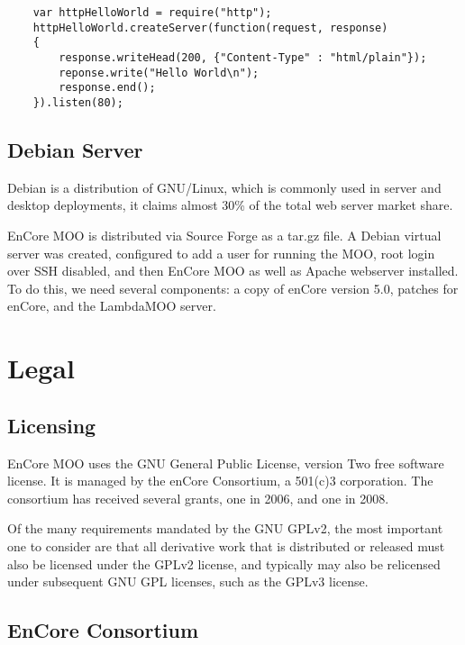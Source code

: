 \documentclass[12pt, letterpaper]{report}
\begin{document}
    \begin{lstlisting}
    var httpHelloWorld = require("http");
    httpHelloWorld.createServer(function(request, response)
    {
        response.writeHead(200, {"Content-Type" : "html/plain"});
        reponse.write("Hello World\n");
        response.end();
    }).listen(80);
    \end{lstlisting}
    
    
	\section{Debian Server}
	\par
	Debian is a distribution of GNU/Linux, which is commonly used in server and desktop deployments, it claims almost 30\% of the total web server market share.
	
	\par 
	EnCore MOO is distributed via Source Forge as a tar.gz file. A Debian virtual server was created, configured to add a user for running the MOO, root login over SSH disabled, and then EnCore MOO as well as Apache webserver installed. To do this, we need several components: a copy of enCore version 5.0, patches for enCore, and the LambdaMOO server.
    	
	\chapter{Legal}
	\section{Licensing}
	\par
	EnCore MOO uses the GNU General Public License, version Two free software license. It is managed by the enCore Consortium, a 501(c)3 corporation. The consortium has received several grants, one in 2006, and one in 2008.
	
	\par
	Of the many requirements mandated by the GNU GPLv2, the most important one to consider are that all derivative work that is distributed or released must also be licensed under the GPLv2 license, and typically may also be relicensed under subsequent GNU GPL licenses, such as the GPLv3 license.
	
	\section{EnCore Consortium}
	\par
    
\end{document}
